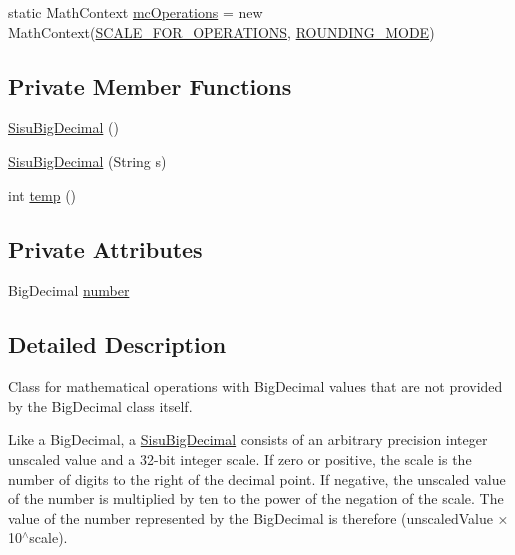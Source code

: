 \begin{DoxyCompactItemize}
\item 
static Math\+Context \hyperlink{classcom_1_1aarrelaakso_1_1drawl_1_1_sisu_big_decimal_a7986e3e83f8b0c7b5a3784757ffc5d1d}{mc\+Operations} = new Math\+Context(\hyperlink{classcom_1_1aarrelaakso_1_1drawl_1_1_sisu_big_decimal_a5dfdeb68abdc4865a00b27136c6e8c54}{S\+C\+A\+L\+E\+\_\+\+F\+O\+R\+\_\+\+O\+P\+E\+R\+A\+T\+I\+O\+NS}, \hyperlink{classcom_1_1aarrelaakso_1_1drawl_1_1_sisu_big_decimal_afcdca984f764db570786fff2442142cb}{R\+O\+U\+N\+D\+I\+N\+G\+\_\+\+M\+O\+DE})
\end{DoxyCompactItemize}
\subsection*{Private Member Functions}
\begin{DoxyCompactItemize}
\item 
\hyperlink{classcom_1_1aarrelaakso_1_1drawl_1_1_sisu_big_decimal_a67a8c41e95f12142516f7a8f8736386a}{Sisu\+Big\+Decimal} ()
\item 
\hyperlink{classcom_1_1aarrelaakso_1_1drawl_1_1_sisu_big_decimal_adb37f7c4abcd831bac26b518c87080af}{Sisu\+Big\+Decimal} (String s)
\item 
int \hyperlink{classcom_1_1aarrelaakso_1_1drawl_1_1_sisu_big_decimal_a17c66373817c4e977bbd7a579246be60}{temp} ()
\end{DoxyCompactItemize}
\subsection*{Private Attributes}
\begin{DoxyCompactItemize}
\item 
Big\+Decimal \hyperlink{classcom_1_1aarrelaakso_1_1drawl_1_1_sisu_big_decimal_af27e00f82037e4c3658558cd6c81af06}{number}
\end{DoxyCompactItemize}


\subsection{Detailed Description}
Class for mathematical operations with Big\+Decimal values that are not provided by the Big\+Decimal class itself. 

Like a Big\+Decimal, a \hyperlink{classcom_1_1aarrelaakso_1_1drawl_1_1_sisu_big_decimal}{Sisu\+Big\+Decimal} consists of an arbitrary precision integer unscaled value and a 32-\/bit integer scale. If zero or positive, the scale is the number of digits to the right of the decimal point. If negative, the unscaled value of the number is multiplied by ten to the power of the negation of the scale. The value of the number represented by the Big\+Decimal is therefore (unscaled\+Value × 10$^\wedge$scale). 

